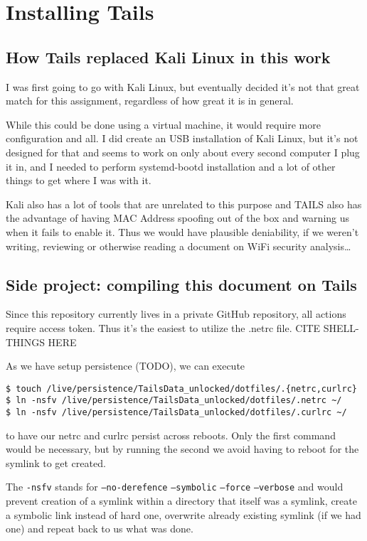 \documentclass[../wifi-security.tex]{subfiles}
\begin{document}
\chapter{Installing Tails}

\section{How Tails replaced Kali Linux in this work}

I was first going to go with Kali Linux, but eventually decided it's not that great match for this assignment, regardless of how great it is in general.

While this could be done using a virtual machine, it would require more configuration and all. I did create an USB installation of Kali Linux, but it's not designed for that and seems to work on only about every second computer I plug it in, and I needed to perform systemd-bootd installation and a lot of other things to get where I was with it.

Kali also has a lot of tools that are unrelated to this purpose and TAILS also has the advantage of having MAC Address spoofing out of the box and warning us when it fails to enable it. Thus we would have plausible deniability, if we weren't writing, reviewing or otherwise reading a document on WiFi security analysis…

\section{Side project: compiling this document on Tails}

Since this repository currently lives in a private GitHub repository, all actions require access token. Thus it's the easiest to utilize the .netrc file. CITE SHELL-THINGS HERE

As we have setup persistence (TODO), we can execute

\begin{verbatim}
$ touch /live/persistence/TailsData_unlocked/dotfiles/.{netrc,curlrc}
$ ln -nsfv /live/persistence/TailsData_unlocked/dotfiles/.netrc ~/
$ ln -nsfv /live/persistence/TailsData_unlocked/dotfiles/.curlrc ~/
\end{verbatim}

to have our netrc and curlrc persist across reboots. Only the first command would be necessary, but by running the second we avoid having to reboot for the symlink to get created.

The \texttt{-nsfv} stands for \texttt{--no-derefence} \texttt{--symbolic} \texttt{--force} \texttt{--verbose} and would prevent creation of a symlink within a directory that itself was a symlink, create a symbolic link instead of hard one, overwrite already existing symlink (if we had one) and repeat back to us what was done.
\end{document}
